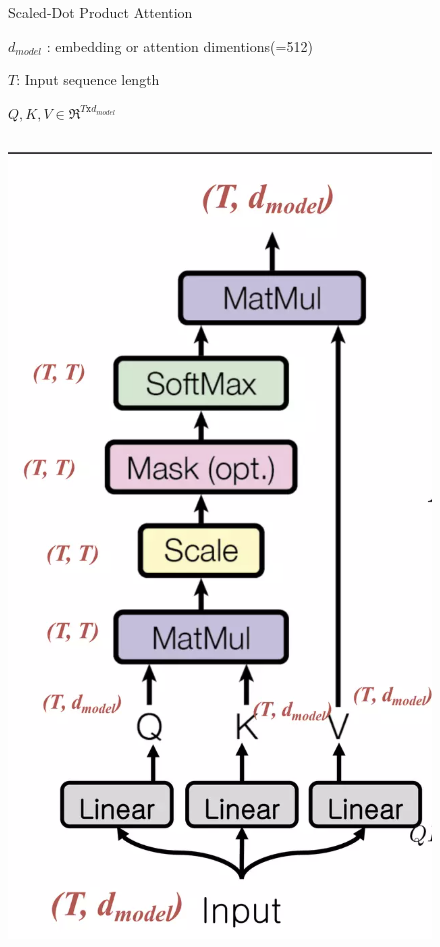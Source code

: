 \documentclass{beamer}
\begin{document}
\begin{frame}{Scaled-Dot Product Attention}

$d_{model}$ : embedding or attention dimentions(=512)

$T$: Input sequence length

$Q,K,V \in \Re^{T \texttt{x} d_{model}}$

\begin{columns}
  \includegraphics[width=1.25\linewidth]{f11.png} %


\end{columns}
\end{frame}
\end{document}
